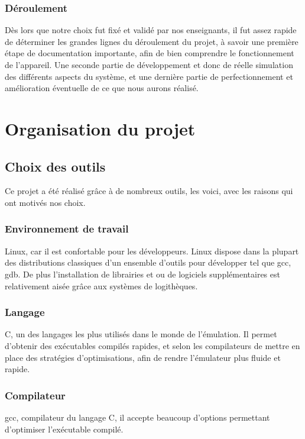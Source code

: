 \documentclass{report}
\begin{document}
\subsection*{Déroulement}
	Dès lors que notre choix fut fixé et validé par nos enseignants, il
	fut assez rapide de déterminer les grandes lignes du déroulement du
	projet, à savoir une première étape de documentation importante, afin
	de bien comprendre le fonctionnement de l'appareil. Une seconde partie
	de développement et donc de réelle simulation des différents aspects
	du système, et une dernière partie de perfectionnement et
	amélioration éventuelle de ce que nous aurons réalisé.

\chapter{Organisation du projet}
\section{Choix des outils}
Ce projet a été réalisé grâce à de nombreux outils, les voici, avec les raisons qui ont motivés nos choix.\\

\subsection{Environnement de travail}
Linux, car il est confortable pour les développeurs. Linux dispose dans la plupart des distributions classiques d'un ensemble d'outils pour développer tel que gcc, gdb. De plus l'installation de librairies et ou de logiciels supplémentaires est relativement aisée grâce aux systèmes de logithèques.

\subsection{Langage}
C, un des langages les plus utilisés dans le monde de l'émulation. Il permet d'obtenir des exécutables compilés rapides, et selon les compilateurs de mettre en place des stratégies d'optimisations, afin de rendre l'émulateur plus fluide et rapide.

\subsection{Compilateur}
gcc, compilateur du langage C, il accepte beaucoup d'options permettant d'optimiser l'exécutable compilé.
\end{document}
